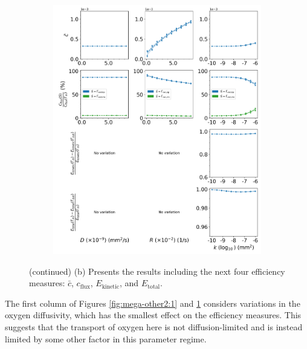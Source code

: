             \begin{figure}\ContinuedFloat
                \centering
                \begin{subfigure}{\textwidth}
                    \includegraphics[width=1\textwidth]{diagrams/results-variations/mega2_oxygen_diffusivity_oxygen_uptake_permeability.png}
                    \caption{}
                    \label{fig:mega-other2:2}
                \end{subfigure}
                \caption{(continued) (b) Presents the results including the next four efficiency measures: $\bar{c}$, $c_\text{flux}$, $E_\text{kinetic}$, and $E_\text{total}$.}
                \label{fig:mega-other2}
            \end{figure}

            The first column of Figures \ref{fig:mega-other2:1} and \ref{fig:mega-other2:2} considers variations in the oxygen diffusivity, which has the smallest effect on the efficiency measures. This suggests that the transport of oxygen here is not diffusion-limited and is instead limited by some other factor in this parameter regime.
            
